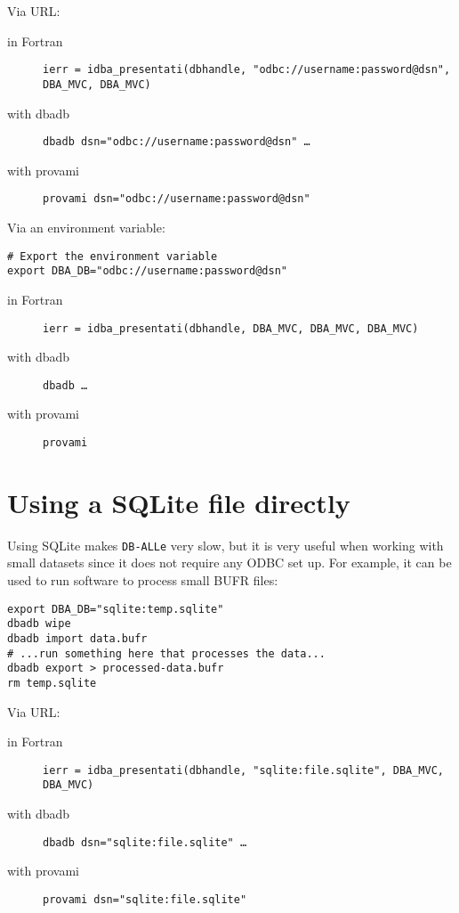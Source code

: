 \documentclass[final,12pt,a4paper,twoside]{book}
\newcommand{\dballe}{{\tt DB-ALLe}}
\begin{document}
Via URL:

\begin{description}
\item[in Fortran]
  {\tt ierr = idba\_presentati(dbhandle, "odbc://username:password@dsn", DBA\_MVC, DBA\_MVC)}
\item[with dbadb]
  {\tt dbadb \-\-dsn="odbc://username:password@dsn" \dots}
\item[with provami]
  {\tt provami \-\-dsn="odbc://username:password@dsn"}
\end{description}

Via an environment variable:

\begin{verbatim}
# Export the environment variable
export DBA_DB="odbc://username:password@dsn"
\end{verbatim}

\begin{description}
\item[in Fortran]
  {\tt ierr = idba\_presentati(dbhandle, DBA\_MVC, DBA\_MVC, DBA\_MVC)}
\item[with dbadb]
  {\tt dbadb \dots}
\item[with provami]
  {\tt provami}
\end{description}

\section{Using a SQLite file directly}

Using SQLite makes \dballe{} very slow, but it is very useful when working with
small datasets since it does not require any ODBC set up. For example, it can
be used to run software to process small BUFR files:

\begin{verbatim}
export DBA_DB="sqlite:temp.sqlite"
dbadb wipe
dbadb import data.bufr
# ...run something here that processes the data...
dbadb export > processed-data.bufr
rm temp.sqlite
\end{verbatim}

Via URL:

\begin{description}
\item[in Fortran]
  {\tt ierr = idba\_presentati(dbhandle, "sqlite:file.sqlite", DBA\_MVC, DBA\_MVC)}
\item[with dbadb]
  {\tt dbadb \-\-dsn="sqlite:file.sqlite" \dots}
\item[with provami]
  {\tt provami \-\-dsn="sqlite:file.sqlite"}
\end{description}
\end{document}
